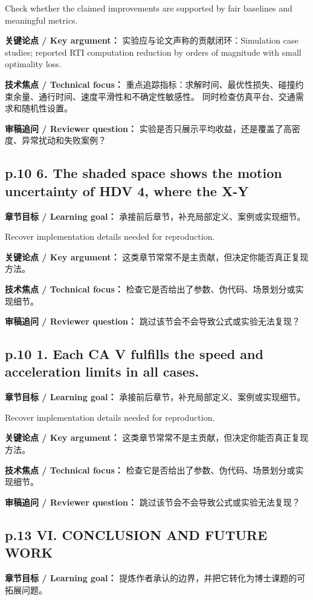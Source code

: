 \documentclass[UTF8,a4paper,11pt,fontset=fandol]{ctexart}
\begin{document}
Check whether the claimed improvements are supported by fair baselines and meaningful metrics.

\textbf{关键论点 / Key argument：} 实验应与论文声称的贡献闭环：Simulation case studies; reported RTI computation reduction by orders of magnitude with small optimality loss.

\textbf{技术焦点 / Technical focus：} 重点追踪指标：求解时间、最优性损失、碰撞约束余量、通行时间、速度平滑性和不确定性敏感性。 同时检查仿真平台、交通需求和随机性设置。

\textbf{审稿追问 / Reviewer question：} 实验是否只展示平均收益，还是覆盖了高密度、异常扰动和失败案例？

\subsection*{p.10 6. The shaded space shows the motion uncertainty of HDV 4, where the X-Y}
\textbf{章节目标 / Learning goal：} 承接前后章节，补充局部定义、案例或实现细节。

Recover implementation details needed for reproduction.

\textbf{关键论点 / Key argument：} 这类章节常常不是主贡献，但决定你能否真正复现方法。

\textbf{技术焦点 / Technical focus：} 检查它是否给出了参数、伪代码、场景划分或实现细节。

\textbf{审稿追问 / Reviewer question：} 跳过该节会不会导致公式或实验无法复现？

\subsection*{p.10 1. Each CA V fulfills the speed and acceleration limits in all cases.}
\textbf{章节目标 / Learning goal：} 承接前后章节，补充局部定义、案例或实现细节。

Recover implementation details needed for reproduction.

\textbf{关键论点 / Key argument：} 这类章节常常不是主贡献，但决定你能否真正复现方法。

\textbf{技术焦点 / Technical focus：} 检查它是否给出了参数、伪代码、场景划分或实现细节。

\textbf{审稿追问 / Reviewer question：} 跳过该节会不会导致公式或实验无法复现？

\subsection*{p.13 VI. CONCLUSION AND FUTURE WORK}
\textbf{章节目标 / Learning goal：} 提炼作者承认的边界，并把它转化为博士课题的可拓展问题。
\end{document}
